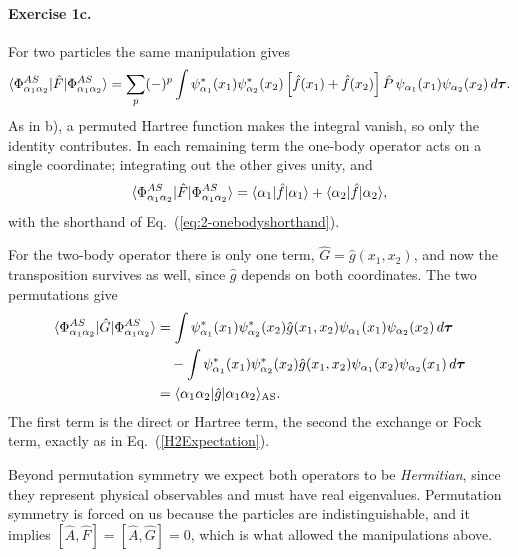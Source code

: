 \paragraph{Exercise 1c.}
For two particles the same manipulation gives
\begin{equation}
  \langle \Phi^{AS}_{\alpha_1\alpha_2} | \hat{F} | \Phi^{AS}_{\alpha_1\alpha_2} \rangle
   = \sum_{p}(-)^{p}\int \psi^{*}_{\alpha_1}(x_1)\psi^{*}_{\alpha_2}(x_2)
     \left[\hat{f}(x_1)+\hat{f}(x_2)\right]\hat{P}\,
     \psi_{\alpha_1}(x_1)\psi_{\alpha_2}(x_2)\,d\bm{\tau} .
  \label{eq:2-w35c1}
\end{equation}
As in b), a permuted Hartree function makes the integral vanish, so only the
identity contributes.  In each remaining term the one-body operator acts on a
single coordinate; integrating out the other gives unity, and
\begin{equation}
  \langle \Phi^{AS}_{\alpha_1\alpha_2} | \hat{F} | \Phi^{AS}_{\alpha_1\alpha_2} \rangle
   = \langle\alpha_1|\hat{f}|\alpha_1\rangle
   + \langle\alpha_2|\hat{f}|\alpha_2\rangle ,
  \label{eq:2-w35c2}
\end{equation}
with the shorthand of Eq.~(\ref{eq:2-onebodyshorthand}).

For the two-body operator there is only one term, $\hat{G}=\hat{g}(x_1,x_2)$,
and now the transposition survives as well, since $\hat{g}$ depends on both
coordinates.  The two permutations give
\begin{align}
  \langle \Phi^{AS}_{\alpha_1\alpha_2} | \hat{G} | \Phi^{AS}_{\alpha_1\alpha_2} \rangle
  &= \int \psi^{*}_{\alpha_1}(x_1)\psi^{*}_{\alpha_2}(x_2)\hat{g}(x_1,x_2)
     \psi_{\alpha_1}(x_1)\psi_{\alpha_2}(x_2)\,d\bm{\tau}\nonumber\\
  &\quad - \int \psi^{*}_{\alpha_1}(x_1)\psi^{*}_{\alpha_2}(x_2)\hat{g}(x_1,x_2)
     \psi_{\alpha_1}(x_2)\psi_{\alpha_2}(x_1)\,d\bm{\tau}\nonumber\\
  &= \langle\alpha_1\alpha_2|\hat{g}|\alpha_1\alpha_2\rangle_{\mathrm{AS}} .
  \label{eq:2-w35c3}
\end{align}
The first term is the direct or Hartree term, the second the exchange or Fock
term, exactly as in Eq.~(\ref{H2Expectation}).

Beyond permutation symmetry we expect both operators to be \emph{Hermitian},
since they represent physical observables and must have real eigenvalues.
Permutation symmetry is forced on us because the particles are
indistinguishable, and it implies
$[\hat{A},\hat{F}]=[\hat{A},\hat{G}]=0$, which is what allowed the
manipulations above.

